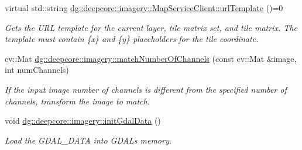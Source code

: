 \begin{DoxyCompactItemize}
virtual std\+::string \hyperlink{group___imagery_module_gaafa4e8cc2a047f6467e227603ccf1a23}{dg\+::deepcore\+::imagery\+::\+Map\+Service\+Client\+::url\+Template} ()=0
\begin{DoxyCompactList}\small\item\em Gets the U\+RL template for the current layer, tile matrix set, and tile matrix. The template must contain \{x\} and \{y\} placeholders for the tile coordinate. \end{DoxyCompactList}\item 
cv\+::\+Mat \hyperlink{group___imagery_module_ga95eb6f615115ac89f33bed1f11861a13}{dg\+::deepcore\+::imagery\+::match\+Number\+Of\+Channels} (const cv\+::\+Mat \&image, int num\+Channels)
\begin{DoxyCompactList}\small\item\em If the input image number of channels is different from the specified number of channels, transform the image to match. \end{DoxyCompactList}\item 
void \hyperlink{group___imagery_module_ga189c04f562d7cd66add6b7cc95bb4b27}{dg\+::deepcore\+::imagery\+::init\+Gdal\+Data} ()
\begin{DoxyCompactList}\small\item\em Load the G\+D\+A\+L\+\_\+\+D\+A\+TA into G\+D\+AL\textquotesingle{}s memory.


\end{DoxyCompactList}
\end{DoxyCompactItemize}
